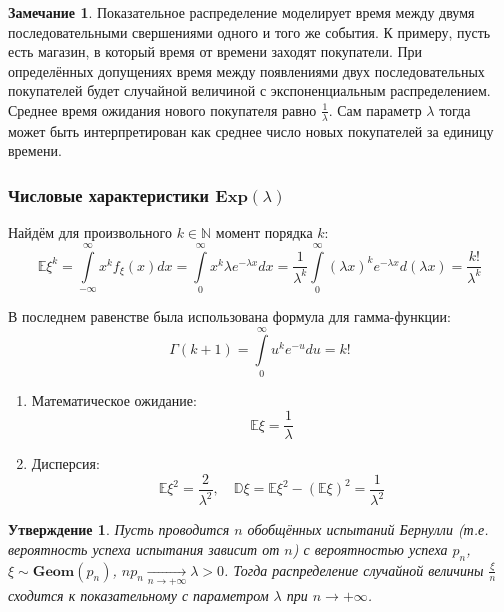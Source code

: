 \documentclass[oneside,final,14pt]{extreport}
\theoremstyle{plain}
\newtheorem*{thm*}{Утверждение}
\theoremstyle{definition}
\newtheorem*{rmrk}{Замечание}
\theoremstyle{named}
\begin{document}
\begin{rmrk}
    Показательное распределение моделирует время между двумя последовательными свершениями одного и того же события. К примеру, пусть есть магазин, в который время от времени заходят покупатели. При определённых допущениях время между появлениями двух последовательных покупателей будет случайной величиной с экспоненциальным распределением. Среднее время ожидания нового покупателя равно $\frac{1}{\lambda}$. Сам параметр $\lambda$ тогда может быть интерпретирован как среднее число новых покупателей за единицу времени. 
\end{rmrk}

\subsubsection{Числовые характеристики $\mathbf{Exp}(\lambda)$}

Найдём для произвольного $k \in \mathbb{N}$ момент порядка $k$:
\begin{equation*}
    \mathbb{E} \xi^{k}=\int\limits_{-\infty}^{\infty} x^{k} f_{\xi}(x) d x=\int\limits_{0}^{\infty} x^{k} \lambda e^{-\lambda x} d x=\frac{1}{\lambda^{k}} \int\limits_{0}^{\infty}(\lambda x)^{k} e^{-\lambda x} d(\lambda x)=\frac{k !}{\lambda^{k}}
\end{equation*}

В последнем равенстве была использована формула для гамма-функции:
\begin{equation*}
    \Gamma(k+1)=\int\limits_{0}^{\infty} u^{k} e^{-u} d u=k !
\end{equation*}
\begin{enumerate}
    \item Математическое ожидание:
    \begin{equation*}
        \mathbb{E} \xi=\frac{1}{\lambda}
    \end{equation*}
    \item Дисперсия:
    \begin{equation*}
        \mathbb{E} \xi^{2}=\frac{2}{\lambda^{2}}, \quad \mathbb{D} \xi=\mathbb{E} \xi^{2}-(\mathbb{E} \xi)^{2}=\frac{1}{\lambda^{2}}
    \end{equation*}
\end{enumerate}

\begin{thm*}
    Пусть проводится $n$ обобщённых испытаний Бернулли (т.е. вероятность успеха испытания зависит от $n$) с вероятностью успеха $p_n$, $\xi \sim \mathbf{Geom}(p_n)$, $n p_{n} \underset{n \to +\infty}{\longrightarrow} \lambda > 0$. Тогда распределение случайной величины $\frac{\xi}{n}$ сходится к показательному с параметром $\lambda$ при $n \to +\infty$.
\end{thm*}
\end{document}

